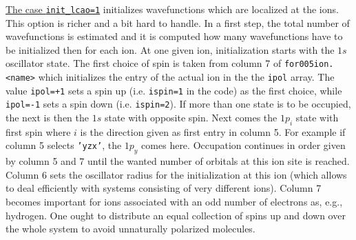 \documentclass[12pt]{article}
\begin{document}
\underline{The case {\tt init\_lcao=1}} initializes wavefunctions
which are localized at the ions. This option is richer and a bit hard
to handle. In a first step, the total number of wavefunctions is
estimated and it is computed how many wavefunctions have to be
initialized then for each ion. At one given ion, initialization starts
with the $1s$ oscillator state. The first choice of spin is taken from
column 7 of {\tt for005ion.<name>} {which initializes the entry of the
  actual ion in the the {\tt ipol}
array. The value {\tt ipol=+1} sets a spin up (i.e. {\tt ispin=1} in
the code) as the first choice, 
while {\tt ipol=-1} sets a spin down (i.e. {\tt ispin=2}).} If more than one state is to be
occupied, the next is then the $1s$ state with opposite spin. Next
comes the $1p_i$ state with first spin where $i$ is the direction
given as first entry in column 5. For example if column 5 selects
{\tt 'yzx'}, the $1p_y$ comes here. Occupation continues in order
given by column 5 and 7 until the wanted number of orbitals at this
ion site is reached. Column 6 sets the oscillator radius for the
initialization at this ion (which allows to deal efficiently with
systems consisting of very different ions). Column 7 becomes important
for ions associated with an odd number of electrons as, e.g.,
hydrogen. One ought to distribute an equal collection of 
{spins up and down over the whole system} to avoid unnaturally 
polarized molecules.
\end{document}
